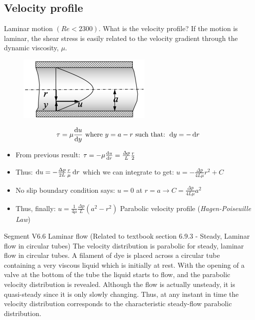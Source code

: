 \documentclass[class=report, crop=false, 12pt,a4paper]{standalone}
\begin{document}
\subsection{Velocity profile}
Laminar motion $\left(Re < 2300\right)$. What is the velocity profile? If the motion is laminar, the shear stress is easily related to the velocity gradient through the dynamic viscosity, $\mu$.
\begin{figure}[H]
  \centering
  \includegraphics[width = 0.3 \textwidth]{../img/diagram82.png}
  \caption{}
\end{figure}
\begin{equation}
  \tau = \mu \frac{\dif u}{\dif y} \textrm{ where } y = a-r \textrm{ such that: } \dif y = -\dif r
\end{equation}
\begin{itemize}
  \item From previous result: $\tau = - \mu \frac{\dif u}{\dif r} = \frac{\Delta p}{L} \frac{r}{2}$
  \item Thus: $\dif u = - \frac{\Delta p}{2L} \frac{r}{\mu} \dif r$ which we can integrate to get: $u = - \frac{\Delta p}{4L\mu} r^2 + C$
  \item No slip boundary condition says: $u = 0$ at $ r = a \rightarrow C = \frac{\Delta p}{4 L \mu} a^2$
  \item Thus, finally: $u = \frac{1}{4\mu} \frac{\Delta p}{L} \left(a^2 - r^2\right)$ Parabolic velocity profile (\textit{Hagen-Poiseuille Law})
\end{itemize}
Segment V6.6 Laminar flow (Related to textbook section 6.9.3 - Steady, Laminar flow in circular tubes) The velocity distribution is parabolic for steady, laminar flow in circular tubes. A filament of dye is placed across a circular tube containing a very viscous liquid which is initially at rest. With the opening of a valve at the bottom of the tube the liquid starts to flow, and the parabolic velocity distribution is revealed. Although the flow is actually unsteady, it is quasi-steady since it is only slowly changing. Thus, at any instant in time the velocity distribution corresponds to the characteristic steady-flow parabolic distribution.
\end{document}

